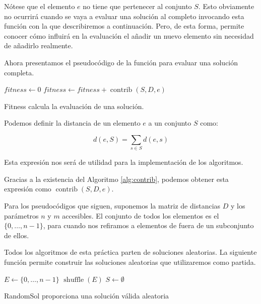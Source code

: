 \documentclass{article}
\begin{document}
Nótese que el elemento $e$ no tiene que pertenecer al conjunto $S$. Esto obviamente no ocurrirá cuando se vaya a evaluar una solución
al completo invocando esta función con la que describiremos a continuación. Pero, de esta forma, permite conocer cómo influirá en la evaluación el añadir
 un nuevo elemento sin necesidad de añadirlo realmente. 
 
 Ahora presentamos el pseudocódigo de la función para evaluar una solución completa.
 
 \begin{algorithm}[H]
 	\DontPrintSemicolon %
 	$fitness \gets 0$\;
 	 {
 		$fitness \gets fitness + \operatorname{contrib}(S,D,e)$ 
 	}
 	 
 	\caption{{\sc Fitness} calcula la evaluación de una solución.}
 	\label{alg:eval}
 \end{algorithm}

Podemos definir la distancia de un elemento $e$ a un conjunto $S$ como:

\begin{equation} \label{eq:distance-elem-set}
	d(e,S)=\sum_{s\in S} d(e,s)
\end{equation}

Esta expresión nos será de utilidad para la implementación de los algoritmos.

Gracias a la existencia del Algoritmo \ref{alg:contrib}, podemos obtener esta expresión como $\operatorname{contrib}(S,D,e)$.

Para los pseudocódigos que siguen, suponemos la matriz de distancias $D$ y los parámetros $n$ y $m$ accesibles. El
conjunto de todos los elementos es el $\{0,\ldots , n-1\}$, para cuando nos refiramos a elementos de fuera de un
 subconjunto
de ellos.

Todos los algoritmos de esta práctica parten de soluciones aleatorias. La siguiente función permite construir
las soluciones aleatorias que utilizaremos como partida.

\begin{algorithm}[H]
	\DontPrintSemicolon %
	$E \gets \{0,\ldots, n-1\}$ 
	$\operatorname{shuffle}(E)$\;
	$S \gets \emptyset$ 
	\;
	\caption{{\sc RandomSol} proporciona una solución válida aleatoria}
	\label{alg:randomsol}
\end{algorithm}
\end{document}
